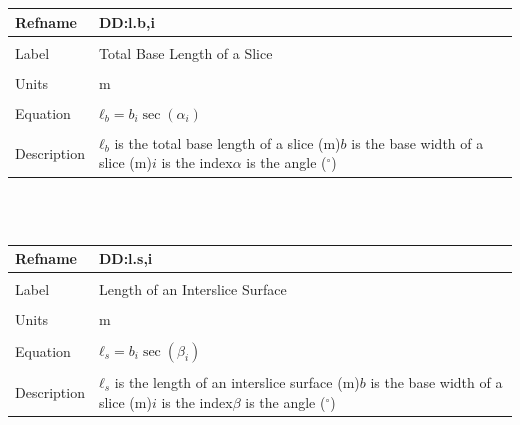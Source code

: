 \documentclass[12pt]{article}
\begin{document}
\noindent \begin{minipage}{\textwidth}
\begin{tabular}{p{} p{}}
\toprule \textbf{Refname} & \textbf{DD:l.b,i}
\label{DD:l.b,i}
\\ \midrule \\
Label & Total Base Length of a Slice
\\ \midrule \\
Units & m
\\ \midrule \\
Equation & ${ℓ_{b}}=b_{i} \sec\left(α_{i}\right)$
\\ \midrule \\
Description & ${ℓ_{b}}$ is the total base length of a slice (m)\newline$b$ is the base width of a slice (m)\newline$i$ is the index\newline$α$ is the angle (${}^{\circ}$)
\\ \bottomrule \end{tabular}
\end{minipage}\\
~\newline
\noindent \begin{minipage}{\textwidth}
\begin{tabular}{p{} p{}}
\toprule \textbf{Refname} & \textbf{DD:l.s,i}
\label{DD:l.s,i}
\\ \midrule \\
Label & Length of an Interslice Surface
\\ \midrule \\
Units & m
\\ \midrule \\
Equation & ${ℓ_{s}}=b_{i} \sec\left(β_{i}\right)$
\\ \midrule \\
Description & ${ℓ_{s}}$ is the length of an interslice surface (m)\newline$b$ is the base width of a slice (m)\newline$i$ is the index\newline$β$ is the angle (${}^{\circ}$)
\\ \bottomrule \end{tabular}
\end{minipage}\\
~\newline
\end{document}
